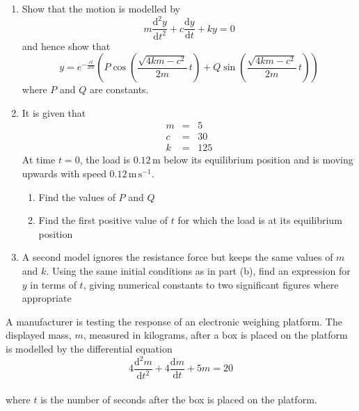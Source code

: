 \documentclass[leqno]{article}
\begin{document}
\begin{enumerate}[
  label=\textbf{\arabic*.},
  leftmargin=*,
  topsep=0pt,
  partopsep=0pt,
  parsep=0pt
]
\begin{enumerate}[label=\textbf{(\alph*)}]
  \item Show that the motion is modelled by
  \[
  m\frac{\mathrm{d}^2 y}{\mathrm{d} t^2}+c\frac{\mathrm{d} y}{\mathrm{d} t}+ky=0
  \]
  and hence show that
  \[
  y=e^{-\frac{c t}{2m}}\left(P\cos\left(\frac{\sqrt{4km-c^2}}{2m}\,t\right)+Q\sin\left(\frac{\sqrt{4km-c^2}}{2m}\,t\right)\right)
  \]
  where $P$ and $Q$ are constants.  \\
  \item It is given that
  \[
  \renewcommand{\arraystretch}{1.2}
  \begin{array}{rcl}
  m&=&5\\
  c&=&30\\
  k&=&125
  \end{array}
  \]
  At time $t=0$, the load is $0.12\,\mathrm{m}$ below its equilibrium position and is moving upwards with speed $0.12\,\mathrm{m\,s^{-1}}$. \\
  \begin{enumerate}[label=(\roman*)]
    \item Find the values of $P$ and $Q$ 
    \item Find the first positive value of $t$ for which the load is at its equilibrium position  \\
  \end{enumerate}
  \item A second model ignores the resistance force but keeps the same values of $m$ and $k$. Using the same initial conditions as in part (b), find an expression for $y$ in terms of $t$, giving numerical constants to two significant figures where appropriate  \\
\end{enumerate}

\newpage

\questionitem

A manufacturer is testing the response of an electronic weighing platform. The displayed mass, $m$, measured in kilograms, after a box is placed on the platform is modelled by the differential equation \\
\[4\frac{\mathrm{d}^2 m}{\mathrm{d} t^2}+4\frac{\mathrm{d} m}{\mathrm{d} t}+5m=20\] \\
where $t$ is the number of seconds after the box is placed on the platform. \\


\end{enumerate}
\end{document}
